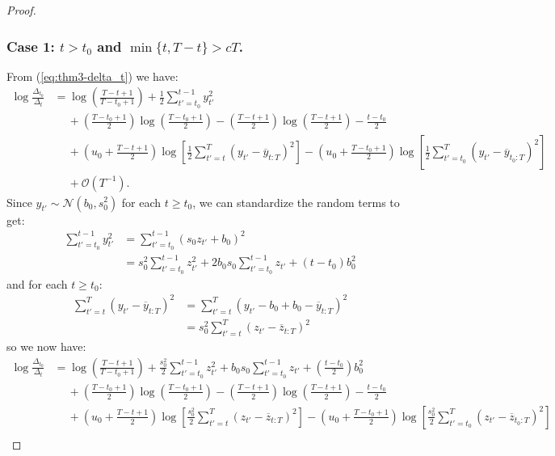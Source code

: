 \documentclass{article}
\begin{document}
\begin{proof}

\subsubsection*{Case 1: $t > t_0$ and $\min\{t, T-t\} > cT$.}

From (\ref{eq:thm3-delta_t}) we have:
\begin{align*}
    \log \frac{\Delta_{t_0}}{\Delta_t} &= \log \left(\frac{T - t + 1}{T - t_0 +1} \right) + \frac{1}{2} \sum_{t' = t_0}^{t - 1} y_{t'}^2 \\
    &\quad\: + \left(\frac{T - t_0 + 1}{2}\right) \log\left(\frac{T-t_0+1}{2}\right) - \left(\frac{T - t + 1}{2}\right) \log\left(\frac{T-t+1}{2}\right) - \frac{t-t_0}{2} \\
    &\quad\: + \left(u_0 + \frac{T - t +1}{2}\right)\log\left[ \frac{1}{2}\sum_{t'=t}^T (y_{t'} - \overline{y}_{t:T})^2 \right]  - \left(u_0 + \frac{T - t_0 +1}{2}\right)\log\left[\frac{1}{2}\sum_{t'=t_0}^T (y_{t'} - \overline{y}_{t_0:T})^2 \right] \\
    &\quad\: + \mathcal{O}(T^{-1}) .
\end{align*}
Since $y_{t'} \sim \mathcal{N}(b_0,s_0^2)$ for each $t \geq t_0$, we can standardize the random terms to get:
\begin{align*}
    \sum_{t' = t_0}^{t - 1} y_{t'}^2 &= \sum_{t' = t_0}^{t - 1} (s_0z_{t'} + b_0)^2 \\
    &= s_0^2 \sum_{t' = t_0}^{t - 1} z_{t'}^2 + 2 b_0 s_0 \sum_{t' = t_0}^{t - 1} z_{t'} + (t-t_0)b_0^2
\end{align*}
and for each $t \geq t_0$:
\begin{align*}
    \sum_{t'=t}^T (y_{t'} - \overline{y}_{t:T})^2 &= \sum_{t'=t}^T (y_{t'} - b_0 + b_0 - \overline{y}_{t:T})^2 \\
    &= s_0^2\sum_{t'=t}^T (z_{t'} - \overline{z}_{t:T})^2 
\end{align*}
so we now have:
\begin{align*}
    \log \frac{\Delta_{t_0}}{\Delta_t} &= \log \left(\frac{T - t + 1}{T - t_0 +1} \right) + \frac{s_0^2}{2} \sum_{t' = t_0}^{t - 1} z_{t'}^2 + b_0 s_0 \sum_{t' = t_0}^{t - 1} z_{t'} + \left(\frac{t-t_0}{2}\right)b_0^2 \\
    &\quad\: + \left(\frac{T - t_0 + 1}{2}\right) \log\left(\frac{T-t_0+1}{2}\right) - \left(\frac{T - t + 1}{2}\right) \log\left(\frac{T-t+1}{2}\right) - \frac{t-t_0}{2} \\
    &\quad\: + \left(u_0 + \frac{T - t +1}{2}\right)\log\left[ \frac{s_0^2}{2}\sum_{t'=t}^T (z_{t'} - \overline{z}_{t:T})^2 \right]  - \left(u_0 + \frac{T - t_0 +1}{2}\right)\log\left[\frac{s_0^2}{2}\sum_{t'=t_0}^T (z_{t'} - \overline{z}_{t_0:T})^2 \right] \\

\end{align*}
\end{proof}
\end{document}
